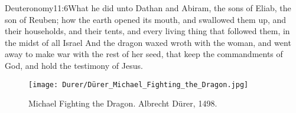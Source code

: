 				  {Deuteronomy}{11:6}{What he did unto Dathan and Abiram, the sons of Eliab, the son of Reuben; how the earth opened its mouth, and swallowed them up, and their households, and their tents, and every living thing that followed them, in the midst of all Israel}
 And the dragon waxed wroth with the woman, and went away to make war with the rest of her seed, that keep the commandments of God, and hold the testimony of Jesus.%

\begin{figure*}[p]
  	\centering
  	\texttt{[image: Durer/Dürer\_Michael\_Fighting\_the\_Dragon.jpg]}
  	\caption[Michael Fighting the Dragon]{Michael Fighting the Dragon. Albrecht Dürer, 1498.}
  \end{figure*}